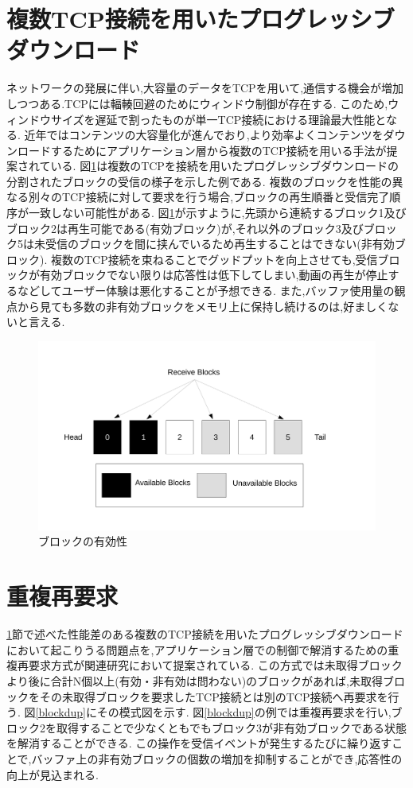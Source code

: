 \documentclass[a4j,12pt]{gradthesis_utf8}
\begin{document}
\clearpage

\section{複数TCP接続を用いたプログレッシブダウンロード}
\label{hukusu}
ネットワークの発展に伴い,大容量のデータをTCPを用いて,通信する機会が増加しつつある.TCPには輻輳回避のためにウィンドウ制御が存在する.
このため,ウィンドウサイズを遅延で割ったものが単一TCP接続における理論最大性能となる.
近年ではコンテンツの大容量化が進んでおり,より効率よくコンテンツをダウンロードするためにアプリケーション層から複数のTCP接続を用いる手法が提案されている.
図\ref{block}は複数のTCPを接続を用いたプログレッシブダウンロードの分割されたブロックの受信の様子を示した例である.
複数のブロックを性能の異なる別々のTCP接続に対して要求を行う場合,ブロックの再生順番と受信完了順序が一致しない可能性がある.
図\ref{block}が示すように,先頭から連続するブロック1及びブロック2は再生可能である(有効ブロック)が,それ以外のブロック3及びブロック5は未受信のブロックを間に挟んでいるため再生することはできない(非有効ブロック).
複数のTCP接続を束ねることでグッドプットを向上させても,受信ブロックが有効ブロックでない限りは応答性は低下してしまい,動画の再生が停止するなどしてユーザー体験は悪化することが予想できる.
また,バッファ使用量の観点から見ても多数の非有効ブロックをメモリ上に保持し続けるのは,好ましくないと言える.
 
\begin{figure}[ht]
	\centering
	\includegraphics[width=18cm]{figure/block.pdf}
	\caption{ブロックの有効性}
	\label{block}
\end{figure}

 \section{重複再要求}
 \label{juhuku}
 \ref{hukusu}節で述べた性能差のある複数のTCP接続を用いたプログレッシブダウンロードにおいて起こりうる問題点を,アプリケーション層での制御で解消するための重複再要求方式が関連研究\cite{proxy}において提案されている.
 この方式では未取得ブロックより後に合計N個以上(有効・非有効は問わない)のブロックがあれば,未取得ブロックをその未取得ブロックを要求したTCP接続とは別のTCP接続へ再要求を行う.
 図\ref{blockdup}にその模式図を示す.
 図\ref{blockdup}の例では重複再要求を行い,ブロック2を取得することで少なくともでもブロック3が非有効ブロックである状態を解消することができる.
 この操作を受信イベントが発生するたびに繰り返すことで,バッファ上の非有効ブロックの個数の増加を抑制することができ,応答性の向上が見込まれる.
 
\end{document}
